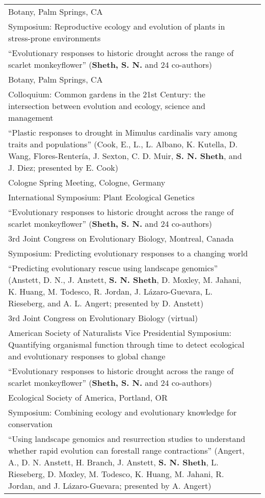 \documentclass[11pt,english]{article}
\providecommand{\tabularnewline}{\\}
\begin{document}
\begin{tabularx}{\textwidth}{@{}>{\raggedright}p{5.25in}
>{\raggedleft}X@{}}

Botany, Palm Springs, CA & 2025 \tabularnewline
\addtolength{\leftskip}{5ex} Symposium: Reproductive ecology and evolution of plants in stress-prone environments  \tabularnewline
\addtolength{\leftskip}{5ex} ``Evolutionary responses to historic drought across the range of scarlet monkeyflower'' (\textbf{Sheth, S. N.} and 24 co-authors)
\tabularnewline

Botany, Palm Springs, CA & 2025 \tabularnewline
\addtolength{\leftskip}{5ex} Colloquium:  Common gardens in the 21st Century: the intersection between evolution and ecology, science and management  \tabularnewline
\addtolength{\leftskip}{5ex} ``Plastic responses to drought in Mimulus cardinalis vary among traits and populations'' (Cook, E., L., L. Albano, K. Kutella, D. Wang, Flores-Rentería, J. Sexton, C. D. Muir, \textbf{S. N. Sheth}, and J. Diez; presented by E. Cook)
\tabularnewline

Cologne Spring Meeting, Cologne, Germany & 2025 \tabularnewline
\addtolength{\leftskip}{5ex} International Symposium: Plant Ecological Genetics  \tabularnewline
\addtolength{\leftskip}{5ex} ``Evolutionary responses to historic drought across the range of scarlet monkeyflower'' (\textbf{Sheth, S. N.} and 24 co-authors)
\tabularnewline

3rd Joint Congress on Evolutionary Biology, Montreal, Canada & 2024 \tabularnewline
\addtolength{\leftskip}{5ex} Symposium: Predicting evolutionary responses to a changing world  \tabularnewline
\addtolength{\leftskip}{5ex} ``Predicting evolutionary rescue using landscape genomics'' (Anstett, D. N., J. Anstett, \textbf{S. N. Sheth}, D. Moxley, M. Jahani,  K. Huang, M. Todesco, R. Jordan, J. L\'azaro-Guevara, L. Rieseberg, and A. L. Angert; presented by D. Anstett)
\tabularnewline

3rd Joint Congress on Evolutionary Biology (virtual) & 2024 \tabularnewline
\addtolength{\leftskip}{5ex} American Society of Naturalists Vice Presidential Symposium: Quantifying organismal function through time to detect ecological and evolutionary responses to global change  \tabularnewline
\addtolength{\leftskip}{5ex} ``Evolutionary responses to historic drought across the range of scarlet monkeyflower'' (\textbf{Sheth, S. N.} and 24 co-authors)
\tabularnewline

Ecological Society of America, Portland, OR & 2023 \tabularnewline
\addtolength{\leftskip}{5ex} Symposium: Combining ecology and evolutionary knowledge for conservation  \tabularnewline
\addtolength{\leftskip}{5ex} ``Using landscape genomics and resurrection studies to understand whether rapid evolution can forestall range contractions'' (Angert, A., D. N. Anstett, H. Branch, J. Anstett, \textbf{S. N. Sheth}, L. Rieseberg, D. Moxley, M. Todesco, K. Huang, M. Jahani, R. Jordan, and J. L\'azaro-Guevara; presented by A. Angert)
\tabularnewline


\end{tabularx}
\end{document}
